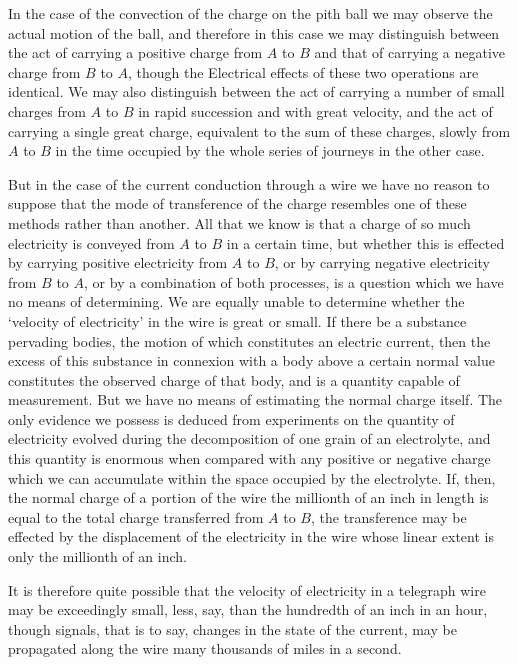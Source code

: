 \documentclass[12pt,oneside]{book}[2021/10/04]
\newcommand{\Runhead}[1]{\fancyhead[C]{\iffloatpage{}{\small#1}}}
\newcommand{\¬}{\hphantom{0}}
\begin{document}
In the case of the convection of the charge on the pith ball we
may observe the actual motion of the ball, and therefore in this
case we may distinguish between the act of carrying a positive
charge from \(A\) to \(B\) and that of carrying a negative charge from
\(B\) to \(A\), though the Electrical effects of these two operations are
identical. We may also distinguish between the act of carrying a
number of small charges from \(A\) to \(B\) in rapid succession and
with great velocity, and the act of carrying a single great
charge, equivalent to the sum of these charges, slowly from \(A\) to
\(B\) in the time occupied by the whole series of journeys in the other
case.

But in the case of the current conduction through a wire we
have no reason to suppose that the mode of transference of the
charge resembles one of these methods rather than another. All
that we know is that a charge of so much electricity is conveyed
from \(A\) to \(B\) in a certain time, but whether this is effected by
carrying positive electricity from \(A\) to \(B\), or by carrying negative
electricity from \(B\) to \(A\), or by a combination of both processes, is a
question which we have no means of determining. We are equally
unable to determine whether the `velocity of electricity' in the
wire is great or small. If there be a substance pervading bodies,
the motion of which constitutes an electric current, then the excess
of this substance in connexion with a body above a certain normal
value constitutes the observed charge of that body, and is a
quantity capable of measurement. But we have no means of
estimating the normal charge itself. The only evidence we possess
is deduced from experiments on the quantity of electricity evolved
during the decomposition of one grain of an electrolyte, and this
quantity is enormous when compared with any positive or negative
charge which we can accumulate within the space occupied by the
electrolyte. If, then, the normal charge of a portion of the wire
the millionth of an inch in length is equal to the total charge
transferred from \(A\) to \(B\), the transference may be effected by the
displacement of the electricity in the wire whose linear extent is
only the millionth of an inch.

It is therefore quite possible that the velocity of electricity in a
telegraph wire may be exceedingly small, less, say, than the
hundredth of an inch in an hour, though signals, that is to say,
changes in the state of the current, may be propagated along the
wire many thousands of miles in a second.
\Runhead{MEASURE OF CURRENT.}
\end{document}
